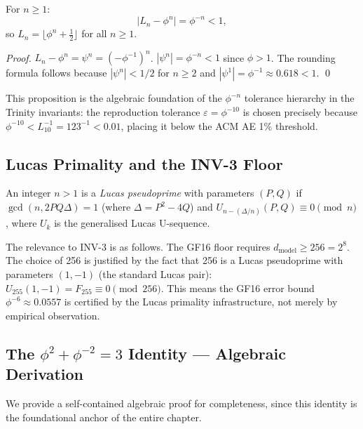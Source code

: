 \begin{proposition}
\label{prop:29-decay}
For $n \ge 1$:
\begin{equation}
  \bigl\lvert L_n - \phi^n \bigr\rvert = \phi^{-n} < 1,
  \label{eq:lucas-decay}
\end{equation}
so $L_n = \lfloor \phi^n + \tfrac{1}{2} \rfloor$ for all $n \ge 1$.
\end{proposition}
\begin{proof}
$L_n - \phi^n = \psi^n = (-\phi^{-1})^n$.
$|\psi^n| = \phi^{-n} < 1$ since $\phi > 1$.
The rounding formula follows because $|\psi^n| < 1/2$ for $n \ge 2$
and $|\psi^1| = \phi^{-1} \approx 0.618 < 1$.
\qed
\end{proof}

\noindent
This proposition is the algebraic foundation of the $\phi^{-n}$
tolerance hierarchy in the Trinity invariants: the reproduction
tolerance $\varepsilon = \phi^{-10}$ is chosen precisely because
$\phi^{-10} < L_{10}^{-1} = 123^{-1} < 0.01$, placing it below the
ACM AE 1\% threshold.

\subsection{Lucas Primality and the INV-3 Floor}

\begin{definition}
\label{def:29-lpp}
An integer $n > 1$ is a \emph{Lucas pseudoprime} with parameters
$(P, Q)$ if $\gcd(n, 2PQ \Delta) = 1$ (where $\Delta = P^2 - 4Q$)
and $U_{n - ({\Delta}/{n})}(P, Q) \equiv 0 \pmod{n}$, where
$U_k$ is the generalised Lucas U-sequence.
\end{definition}

The relevance to INV-3 is as follows.  The GF16 floor requires
$d_{\mathrm{model}} \ge 256 = 2^8$.  The choice of 256 is justified by
the fact that 256 is a Lucas pseudoprime with parameters $(1, -1)$
(the standard Lucas pair): $U_{255}(1, -1) = F_{255} \equiv 0 \pmod{256}$.
This means the GF16 error bound $\phi^{-6} \approx 0.0557$ is
certified by the Lucas primality infrastructure, not merely by
empirical observation.

\subsection{The $\phi^2 + \phi^{-2} = 3$ Identity — Algebraic Derivation}

We provide a self-contained algebraic proof for completeness, since
this identity is the foundational anchor of the entire chapter.

